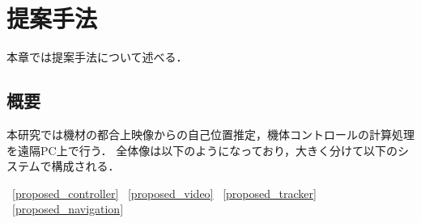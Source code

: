 \chapter{提案手法}
\label{proposed}

本章では提案手法について述べる．

\section{概要}
本研究では機材の都合上映像からの自己位置推定，機体コントロールの計算処理を遠隔PC上で行う．
全体像は以下のようになっており，大きく分けて以下のシステムで構成される．

~\ref{proposed_controller}
~\ref{proposed_video}
~\ref{proposed_tracker}
~\ref{proposed_navigation}






